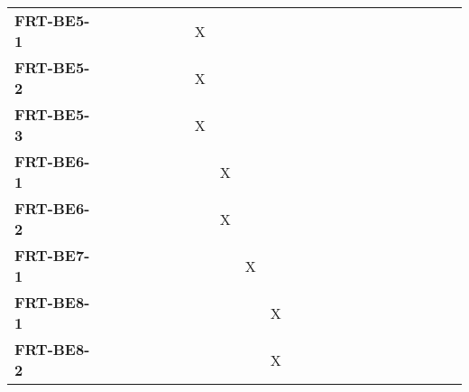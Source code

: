 \documentclass[12pt, titlepage]{article}
\begin{document}
\begin{landscape}
\begin{longtable}{|l|cccccccccccccccc|}
		\textbf{FRT-BE5-1}  & ~                                                         & ~            & ~            & ~            & X            & ~            & ~            & ~            & ~            & ~             & ~             & ~             & ~             & ~             & ~             & ~             \\
		\textbf{FRT-BE5-2}  & ~                                                         & ~            & ~            & ~            & X            & ~            & ~            & ~            & ~            & ~             & ~             & ~             & ~             & ~             & ~             & ~             \\
		\textbf{FRT-BE5-3}  & ~                                                         & ~            & ~            & ~            & X            & ~            & ~            & ~            & ~            & ~             & ~             & ~             & ~             & ~             & ~             & ~             \\
		\textbf{FRT-BE6-1}  & ~                                                         & ~            & ~            & ~            & ~            & X            & ~            & ~            & ~            & ~             & ~             & ~             & ~             & ~             & ~             & ~             \\
		\textbf{FRT-BE6-2}  & ~                                                         & ~            & ~            & ~            & ~            & X            & ~            & ~            & ~            & ~             & ~             & ~             & ~             & ~             & ~             & ~             \\
		\textbf{FRT-BE7-1}  & ~                                                         & ~            & ~            & ~            & ~            & ~            & X            & ~            & ~            & ~             & ~             & ~             & ~             & ~             & ~             & ~             \\
		\textbf{FRT-BE8-1}  & ~                                                         & ~            & ~            & ~            & ~            & ~            & ~            & X            & ~            & ~             & ~             & ~             & ~             & ~             & ~             & ~             \\
		\textbf{FRT-BE8-2}  & ~                                                         & ~            & ~            & ~            & ~            & ~            & ~            & X            & ~            & ~             & ~             & ~             & ~             & ~             & ~             & ~             \\

\end{longtable}
\end{landscape}
\end{document}
